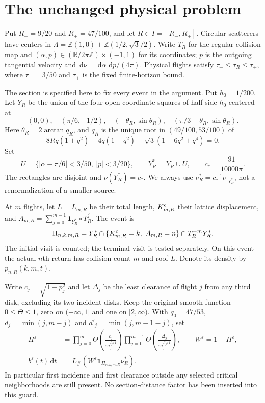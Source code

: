\documentclass[11pt,reqno]{amsart}
\numberwithin{equation}{section}
\theoremstyle{definition}\newtheorem{definition}[theorem]{Definition}
\theoremstyle{remark}\newtheorem{remark}[theorem]{Remark}
\newcommand{\R}{\mathbb R}\newcommand{\Z}{\mathbb Z}\newcommand{\T}{\mathbb T}
\newcommand{\dd}{\,\mathrm d}\newcommand{\one}{\mathbf1}
\theoremstyle{definition}\newtheorem{inputstatement}[theorem]{Input statement}
\begin{document}
\section{The unchanged physical problem}
Put $R_-=9/20$ and $R_+=47/100$, and let $R\in I=[R_-,R_+]$. Circular scatterers have centers in
$\Lambda=\Z(1,0)+\Z(1/2,\sqrt3/2)$. Write $T_R$ for the regular
collision map and $(\alpha,p)\in(\R/2\pi\Z)\times(-1,1)$ for its
coordinates; $p$ is the outgoing tangential velocity and
$\dd\nu=\dd\alpha\,\dd p/(4\pi)$. Physical flights satisfy
$\tau_-\le\tau_R\le\tau_+$, where $\tau_-=3/50$ and $\tau_+$
is the fixed finite-horizon bound.

The section is specified here to fix every event in the argument.
Put $h_0=1/200$. Let $Y_R$ be the union of the four open coordinate
squares of half-side $h_0$ centered at
\[
 (0,0),\quad(\pi/6,-1/2),\quad
 (-\theta_R,\sin\theta_R),\quad
 (\pi/3-\theta_R,\sin\theta_R).
\]
Here $\theta_R=2\arctan q_R$, and $q_R$ is the unique root in
$(49/100,53/100)$ of
\[
 8Rq(1+q^2)-4q(1-q^2)+\sqrt3(1-6q^2+q^4)=0.
\]
Set
\[
 U=\{|\alpha-\pi/6|<3/50,\ |p|<3/20\},\qquad
 Y_R^*=Y_R\cup U,\qquad c_*=\frac{91}{10000\pi}.
\]
The rectangles are disjoint and $\nu(Y_R^*)=c_*$. We always use
$\nu_R^*=c_*^{-1}\nu|_{Y_R^*}$, not a renormalization of a smaller
source.

At $m$ flights, let $L=L_{m,R}$ be their total length,
$K^{\rm c}_{m,R}$ their lattice displacement, and
$A_{m,R}=\sum_{j=0}^{m-1}\one_{Y_R^*}\circ T_R^j$. The event is
\begin{equation}\label{eq:v76-event}
 \Pi_{n,k,m,R}=Y_R^*\cap\{K^{\rm c}_{m,R}=k,\ A_{m,R}=n\}
                         \cap T_R^{-m}Y_R^*.
\end{equation}
The initial visit is counted; the terminal visit is tested separately.
On this event the actual $n$th return has collision count $m$ and
roof $L$. Denote its density by $p_{n,R}(k,m,t)$.

Write $c_j=\sqrt{1-p_j^2}$ and let $\Delta_j$ be the least clearance
of flight $j$ from any third disk, excluding its two incident disks.
Keep the original smooth function $0\le\Theta\le1$, zero on
$(-\infty,1]$ and one on $[2,\infty)$. With $q_0=47/53$,
$d_j=\min(j,m-j)$ and $d'_j=\min(j,m-1-j)$, set
\begin{align}
 H^\varepsilon&=
 \prod_{j=0}^{m}\Theta\!\left(\frac{c_j}{\varepsilon q_0^{d_j/4}}\right)
 \prod_{j=0}^{m-1}\Theta\!\left(\frac{\Delta_j}{\varepsilon q_0^{d'_j/4}}\right),
 \qquad W^\varepsilon=1-H^\varepsilon,\label{eq:v76-guard}\\
 b^\varepsilon(t)\dd t
   &=L_\#(W^\varepsilon\one_{\Pi_{n,k,m,R}}\nu_R^*).
 \label{eq:v76-source}
\end{align}
In particular first incidence and first clearance outside any selected
critical neighborhoods are still present. No section-distance factor
has been inserted into this guard.
\end{document}
